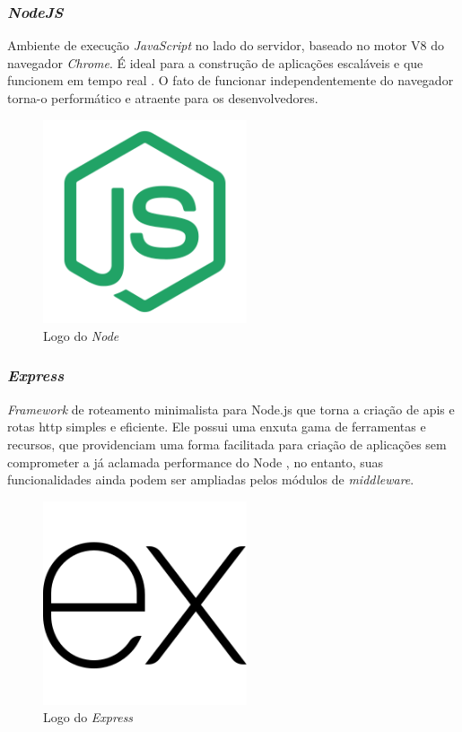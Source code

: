 \subsubsection{\emph{NodeJS}} 
Ambiente de execução \emph{JavaScript} no lado do servidor, baseado no motor V8 do navegador \emph{Chrome}. É ideal para a construção de aplicações escaláveis e que funcionem em tempo real \cite{node}. O fato de funcionar independentemente do navegador torna-o performático e atraente para os desenvolvedores.

\begin{figure}[htb]
	\centering
	\includegraphics[width=6cm]{cap04-desenvolvimento/images/4-4-2-1-node-logo.png}
	\caption{Logo do \emph{Node}}
	\label{fig:node-logo}
\end{figure}

\subsubsection{\emph{Express}} 
\emph{Framework} de roteamento minimalista para Node.js que torna a criação de \gls{api}s e rotas \gls{http} simples e eficiente. Ele possui uma enxuta gama de ferramentas e recursos, que providenciam uma forma facilitada para criação de aplicações sem comprometer a já aclamada performance do Node \cite{express}, no entanto, suas funcionalidades ainda podem ser ampliadas pelos módulos de \emph{middleware}.

\begin{figure}[htb]
	\centering
	\includegraphics[width=6cm]{cap04-desenvolvimento/images/4-4-2-2-express-logo.png}
	\caption{Logo do \emph{Express}}
	\label{fig:express-logo}
\end{figure}

